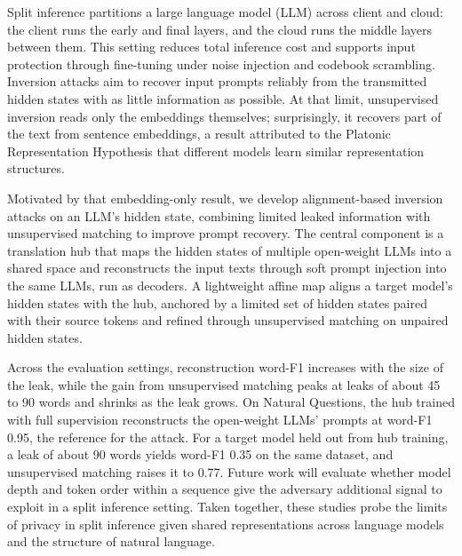 
Split inference partitions a large language model (LLM) across client and cloud: the client runs the early and final layers, and the cloud runs the middle layers between them. This setting reduces total inference cost and supports input protection through fine-tuning under noise injection and codebook scrambling. Inversion attacks aim to recover input prompts reliably from the transmitted hidden states with as little information as possible. At that limit, unsupervised inversion reads only the embeddings themselves; surprisingly, it recovers part of the text from sentence embeddings, a result attributed to the Platonic Representation Hypothesis that different models learn similar representation structures.

Motivated by that embedding-only result, we develop alignment-based inversion attacks on an LLM's hidden state, combining limited leaked information with unsupervised matching to improve prompt recovery. The central component is a translation hub that maps the hidden states of multiple open-weight LLMs into a shared space and reconstructs the input texts through soft prompt injection into the same LLMs, run as decoders. A lightweight affine map aligns a target model's hidden states with the hub, anchored by a limited set of hidden states paired with their source tokens and refined through unsupervised matching on unpaired hidden states.

Across the evaluation settings, reconstruction word-F1 increases with the size of the leak, while the gain from unsupervised matching peaks at leaks of about 45 to 90 words and shrinks as the leak grows. On Natural Questions, the hub trained with full supervision reconstructs the open-weight LLMs' prompts at word-F1 0.95, the reference for the attack. For a target model held out from hub training, a leak of about 90 words yields word-F1 0.35 on the same dataset, and unsupervised matching raises it to 0.77. Future work will evaluate whether model depth and token order within a sequence give the adversary additional signal to exploit in a split inference setting. Taken together, these studies probe the limits of privacy in split inference given shared representations across language models and the structure of natural language.